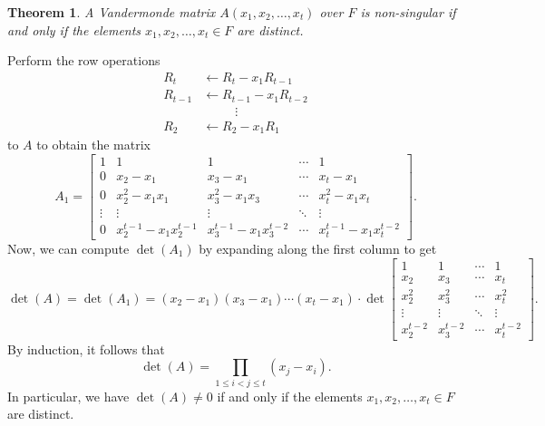 \documentclass[10pt]{article}
\makeatletter
\theoremstyle{newstyle}
\newtheorem{thm}{Theorem}[subsection]
\newenvironment{pf}[1][\proofname]{\par
  \pushQED{\qed}%
  \normalfont \topsep0\p@\relax
  \trivlist
  \item[\hskip\labelsep\scshape
  #1\@addpunct{.}]\ignorespaces
}{%
  \popQED\endtrivlist\@endpefalse
}
\makeatother
\begin{document}
\begin{thm}
A Vandermonde matrix $A(x_1, x_2, \dots, x_t)$ over $F$ is non-singular if and only if the elements 
$x_1, x_2, \dots, x_t \in F$ are distinct. 
\end{thm}
\begin{pf}
Perform the row operations 
\begin{align*}
    R_t &\gets R_t - x_1R_{t-1} \\ 
    R_{t-1} &\gets R_{t-1} - x_1R_{t-2} \\
    &\qquad\;\; \vdots \\ 
    R_2 &\gets R_2 - x_1R_1
\end{align*}
to $A$ to obtain the matrix 
\[ A_1 = \begin{bmatrix}
1 & 1 & 1 & \cdots & 1 \\
0 & x_2-x_1 & x_3-x_1 & \cdots & x_t-x_1 \\
0 & x_2^2-x_1x_1 & x_3^2-x_1x_3 & \cdots & x_t^2-x_1x_t \\
\vdots & \vdots & \vdots & \ddots & \vdots \\ 
0 & x_2^{t-1}-x_1x_2^{t-1} & x_3^{t-1}-x_1x_3^{t-2} & \cdots & x_t^{t-1}-x_1x_t^{t-2} 
\end{bmatrix}. \]
Now, we can compute $\det(A_1)$ by expanding along the first column to get 
\[ \det(A) = \det(A_1) = (x_2-x_1)(x_3-x_1)\cdots(x_t-x_1) \cdot 
\det \begin{bmatrix}
1 & 1 & \cdots & 1 \\ 
x_2 & x_3 & \cdots & x_t \\
x_2^2 & x_3^2 & \cdots & x_t^2 \\
\vdots & \vdots & \ddots & \vdots \\
x_2^{t-2} & x_3^{t-2} & \cdots & x_t^{t-2} 
\end{bmatrix}. \]
By induction, it follows that 
\[ \det(A) = \prod_{1 \leq i < j \leq t} (x_j - x_i). \]
In particular, we have $\det(A) \neq 0$ if and only if the elements $x_1, x_2, \dots, x_t \in F$ 
are distinct. 
\end{pf}
\end{document}
